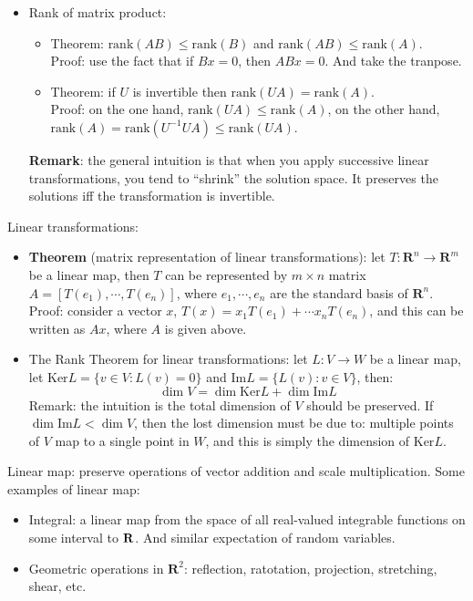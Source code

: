 \documentclass{report}
\begin{document}
\begin{itemize}
\item Rank of matrix product: 
\begin{itemize}
	\item Theorem: $\text{rank}(AB) \leq \text{rank}(B)$ and $\text{rank}(AB) \leq \text{rank}(A)$. \\
	Proof: use the fact that if $Bx = 0$, then $ABx = 0$. And take the tranpose.  
	\item Theorem: if $U$ is invertible then $\text{rank}(UA) = \text{rank}(A)$. \\
	Proof: on the one hand, $\text{rank}(UA) \leq \text{rank}(A)$, on the other hand, $\text{rank}(A) = \text{rank}(U^{-1}UA)\leq \text{rank}(UA)$. 
\end{itemize}
\textbf{Remark}: the general intuition is that when you apply successive linear transformations, you tend to ``shrink'' the solution space. It preserves the solutions iff the transformation is invertible. 

\end{itemize}

Linear transformations: 
\begin{itemize}
\item \textbf{Theorem} (matrix representation of linear transformations): let $T: \mathbf{R}^n \rightarrow \mathbf{R}^m$ be a linear map, then $T$ can be represented by $m \times n$ matrix $A = [T(e_1), \cdots, T(e_n)]$, where $e_1, \cdots, e_n$ are the standard basis of $\mathbf{R}^n$. \\
Proof: consider a vector $x$, $T(x) = x_1 T(e_1) + \cdots x_n T(e_n)$, and this can be written as $A x$, where $A$ is given above. 	
	
\item The Rank Theorem for linear transformations: let $L: V \rightarrow W$ be a linear map, let $\text{Ker}L = \{v \in V: L(v)=0\}$ and $\text{Im}L = \{L(v): v \in V\}$, then: 
\begin{equation}
\dim V = \dim \text{Ker}L + \dim \text{Im}L
\end{equation}
Remark: the intuition is the total dimension of $V$ should be preserved. If $\dim \text{Im}L < \dim V$, then the lost dimension must be due to: multiple points of $V$ map to a single point in $W$, and this is simply the dimension of $\text{Ker}L$. 
\end{itemize}

Linear map: preserve operations of vector addition and scale multiplication. Some examples of linear map:
\begin{itemize}
	\item Integral: a linear map from the space of all real-valued integrable functions on some interval to $\bf{R}$. And similar expectation of random variables. 
	\item Geometric operations in $\mathbf{R}^2$: reflection, ratotation, projection, stretching, shear, etc. 
\end{itemize}
\end{document}

